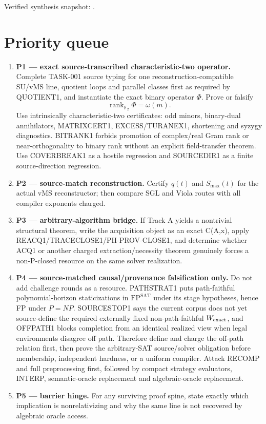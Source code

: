 \documentclass[11pt]{article}
\begin{document}
Verified synthesis snapshot: .

\section{Priority queue}

\begin{enumerate}
\item \textbf{P1 --- exact source-transcribed characteristic-two operator.}
Complete TASK-001 source typing for one reconstruction-compatible SU/vMS line, quotient loops and
parallel classes first as required by QUOTIENT1, and instantiate the exact binary operator \(\Phi\).
Prove or falsify
\[
\operatorname{rank}_{\mathbb F_2}\Phi=\omega(m).
\]
Use intrinsically characteristic-two certificates: odd minors, binary-dual annihilators,
MATRIXCERT1, EXCESS/TURANEX1, shortening and syzygy diagnostics. BITRANK1 forbids promotion of
complex/real Gram rank or near-orthogonality to binary rank without an explicit field-transfer
theorem. Use COVERBREAK1 as a hostile regression and SOURCEDIR1 as a finite source-direction
regression.

\item \textbf{P2 --- source-match reconstruction.}
Certify \(q(t)\) and \(S_{\max}(t)\) for the actual vMS reconstructor; then compare SGL and Viola
routes with all compiler exponents charged.

\item \textbf{P3 --- arbitrary-algorithm bridge.}
If Track A yields a nontrivial structural theorem, write the acquisition object as an exact C(A,x), apply REACQ1/TRACECLOSE1/PH-PROV-CLOSE1, and determine whether ACQ1 or another charged extraction/necessity theorem genuinely forces a non-P-closed resource on the same solver realization.

\item \textbf{P4 --- source-matched causal/provenance falsification only.}
Do not add challenge rounds as a resource. PATHSTRAT1 puts path-faithful polynomial-horizon
staticizations in \(\mathrm{FP}^{\mathrm{SAT}}\) under its stage hypotheses, hence FP under \(P=NP\).
SOURCESTOP1 says the current corpus does not yet source-define the required externally fixed
non-path-faithful \(W_{\rm exact}\), and OFFPATH1 blocks completion from an identical realized view
when legal environments disagree off path. Therefore define and charge the off-path relation first,
then prove the arbitrary-SAT source/solver obligation before membership, independent hardness, or a
uniform compiler. Attack RECOMP and full preprocessing first, followed by compact strategy
evaluators, INTERP, semantic-oracle replacement and algebraic-oracle replacement.

\item \textbf{P5 --- barrier hinge.}
For any surviving proof spine, state exactly which implication is nonrelativizing and why the same
line is not recovered by algebraic oracle access.
\end{enumerate}
\end{document}
